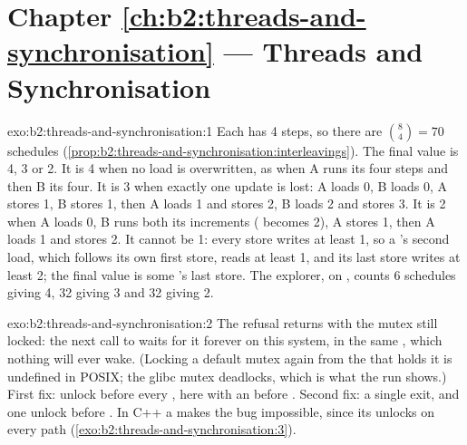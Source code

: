 \section*{Chapter \ref{ch:b2:threads-and-synchronisation} --- Threads and Synchronisation}

\begin{solution}{exo:b2:threads-and-synchronisation:1}
Each  has 4 steps, so there are $\binom{8}{4} = 70$ schedules (\cref{prop:b2:threads-and-synchronisation:interleavings}).
The final value is 4, 3 or 2. It is 4 when no load is overwritten, as when A runs its four steps and then B its four.
It is 3 when exactly one update is lost: A loads 0, B loads 0, A stores 1, B stores 1, then A loads 1 and stores 2, B
loads 2 and stores 3. It is 2 when A loads 0, B runs both its increments ( becomes 2), A stores 1, then A
loads 1 and stores 2. It cannot be 1: every store writes at least 1, so a 's second load, which follows its own
first store, reads at least 1, and its last store writes at least 2; the final value is some 's last store. The explorer, on , counts 6 schedules
giving 4, 32 giving 3 and 32 giving 2.
\end{solution}

\begin{solution}{exo:b2:threads-and-synchronisation:2}
The refusal returns with the mutex still locked: the next call to  waits for it forever on this system, in the same
, which nothing will ever wake. (Locking a default mutex again from the  that holds it is
undefined in POSIX; the glibc mutex deadlocks, which is what the run shows.) First fix: unlock before every , here with an
 before . Second fix: a single exit,  and one unlock before . In C++ a  makes the bug
impossible, since its  unlocks on every path (\cref{exo:b2:threads-and-synchronisation:3}).
\end{solution}

